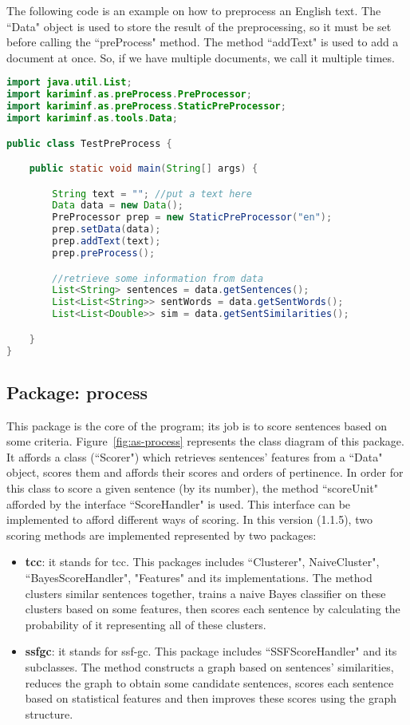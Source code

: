 The following code is an example on how to preprocess an English text. 
The ``Data" object is used to store the result of the preprocessing, so it must be set before calling the ``preProcess" method.
The method ``addText" is used to add a document at once. 
So, if we have multiple documents, we call it multiple times. 

\begin{lstlisting}[language={Java}, style=codeStyle]
import java.util.List;
import kariminf.as.preProcess.PreProcessor;
import kariminf.as.preProcess.StaticPreProcessor;
import kariminf.as.tools.Data;

public class TestPreProcess {

    public static void main(String[] args) {

        String text = ""; //put a text here
        Data data = new Data();
        PreProcessor prep = new StaticPreProcessor("en");
        prep.setData(data);
        prep.addText(text);
        prep.preProcess();

        //retrieve some information from data
        List<String> sentences = data.getSentences();
        List<List<String>> sentWords = data.getSentWords();
        List<List<Double>> sim = data.getSentSimilarities();

    }
}

\end{lstlisting}

\subsection{Package: process}

This package is the core of the program; its job is to score sentences based on some criteria. 
Figure~\ref{fig:as-process} represents the class diagram of this package. 
It affords a class (``Scorer") which retrieves sentences' features from a ``Data" object, scores them and affords their scores and orders of pertinence. 
In order for this class to score a given sentence (by its number), the method ``scoreUnit" afforded by the interface ``ScoreHandler" is used.
This interface can be implemented to afford different ways of scoring. 
In this version (1.1.5), two scoring methods are implemented represented by two packages:
\begin{itemize}
	\item \textbf{tcc}: it stands for \acl{tcc}.
	This packages includes ``Clusterer", NaiveCluster", ``BayesScoreHandler", "Features" and its implementations. 
	The method clusters similar sentences together, trains a naive Bayes classifier on these clusters based on some features, then scores each sentence by calculating the probability of it representing all of these clusters. 
	\item \textbf{ssfgc}: it stands for \acl{ssf-gc}. 
	This package includes ``SSFScoreHandler" and its subclasses. 
	The method constructs a graph based on sentences' similarities, reduces the graph to obtain some candidate sentences, scores each sentence based on statistical features and then improves these scores using the graph structure.
\end{itemize}

